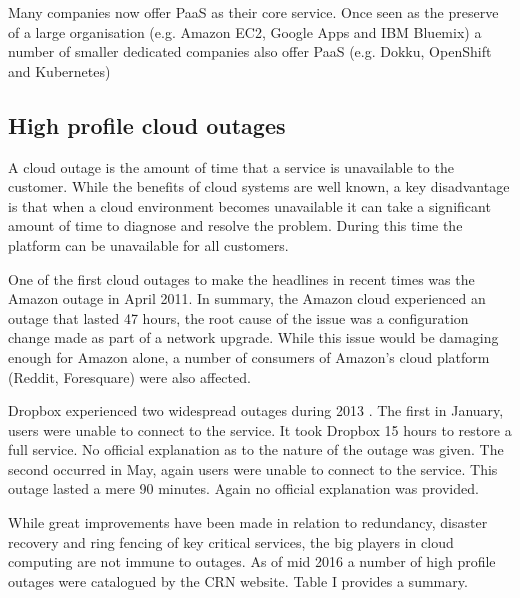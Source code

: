 \documentclass[5p]{elsarticle}
\begin{document}
Many companies now offer PaaS as their core service. Once seen as the preserve of a large organisation (e.g. Amazon EC2, Google Apps and IBM Bluemix) a number of smaller dedicated companies also offer PaaS (e.g. Dokku, OpenShift and Kubernetes) \cite{Paas2016}


\subsection{High profile cloud outages}
A cloud outage is the amount of time that a service is unavailable to the customer. While the benefits of cloud systems are well known, a key disadvantage is that when a cloud environment becomes unavailable it can take a significant amount of time to diagnose and resolve the problem. During this time the platform can be unavailable for all customers.

One of the first cloud outages to make the headlines in recent times was the Amazon outage in April 2011. In summary, the Amazon cloud experienced an outage that lasted 47 hours, the root cause of the issue was a configuration change made as part of a network upgrade. While this issue would be damaging enough for Amazon alone, a number of consumers of Amazon's cloud platform (Reddit, Foresquare) were also affected. \cite{InfoWorld2015outage} 

Dropbox experienced two widespread outages during 2013 \cite{Talbot013DBoutage, Etherington2013DBoutage}. The first in January, users were unable to connect to the service. It took Dropbox 15 hours to restore a full service. No official explanation as to the nature of the outage was given. The second occurred in May, again users were unable to connect to the service. This outage lasted a mere 90 minutes. Again no official explanation was provided.

While great improvements have been made in relation to redundancy, disaster recovery and ring fencing of key critical services, the big players in cloud computing are not immune to outages. As of mid 2016 a number of high profile outages were catalogued by the CRN website. \cite{CRN2016outage} Table I provides a summary. 
\end{document}
